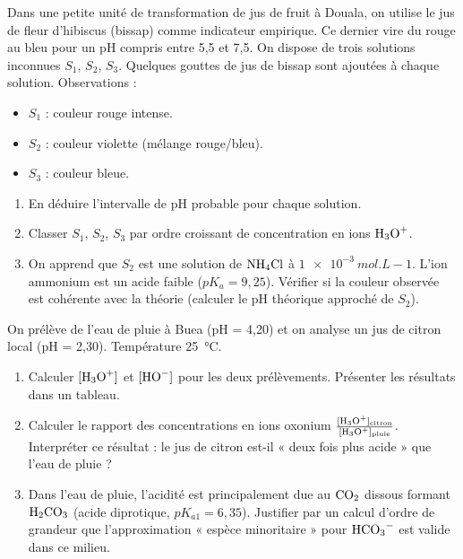 \documentclass[11pt]{article}
\begin{document}
\begin{exercice}
Dans une petite unité de transformation de jus de fruit à Douala, on utilise le jus de fleur d'hibiscus (bissap) comme indicateur empirique. Ce dernier vire du rouge au bleu pour un pH compris entre 5,5 et 7,5. On dispose de trois solutions inconnues $S_1$, $S_2$, $S_3$. Quelques gouttes de jus de bissap sont ajoutées à chaque solution. Observations :
\begin{itemize}
    \item $S_1$ : couleur rouge intense.
    \item $S_2$ : couleur violette (mélange rouge/bleu).
    \item $S_3$ : couleur bleue.
\end{itemize}
\begin{enumerate}
    \item En déduire l'intervalle de pH probable pour chaque solution.
    \item Classer $S_1$, $S_2$, $S_3$ par ordre croissant de concentration en ions $\ce{H3O+}$.
    \item On apprend que $S_2$ est une solution de $\ce{NH4Cl}$ à $\SI{1e-3}{mol.L-1}$. L'ion ammonium est un acide faible ($pK_a = 9,25$). Vérifier si la couleur observée est cohérente avec la théorie (calculer le pH théorique approché de $S_2$).
\end{enumerate}
\end{exercice}

\begin{exercice}
On prélève de l'eau de pluie à Buea (pH = 4,20) et on analyse un jus de citron local (pH = 2,30). Température \SI{25}{\celsius}.
\begin{enumerate}
    \item Calculer $[\ce{H3O+}]$ et $[\ce{HO-}]$ pour les deux prélèvements. Présenter les résultats dans un tableau.
    \item Calculer le rapport des concentrations en ions oxonium $\frac{[\ce{H3O+}]_{\text{citron}}}{[\ce{H3O+}]_{\text{pluie}}}$. Interpréter ce résultat : le jus de citron est-il « deux fois plus acide » que l'eau de pluie ?
    \item Dans l'eau de pluie, l'acidité est principalement due au $\ce{CO2}$ dissous formant $\ce{H2CO3}$ (acide diprotique, $pK_{a1}=6,35$). Justifier par un calcul d'ordre de grandeur que l'approximation « espèce minoritaire » pour $\ce{HCO3-}$ est valide dans ce milieu.
\end{enumerate}
\end{exercice}
\end{document}
